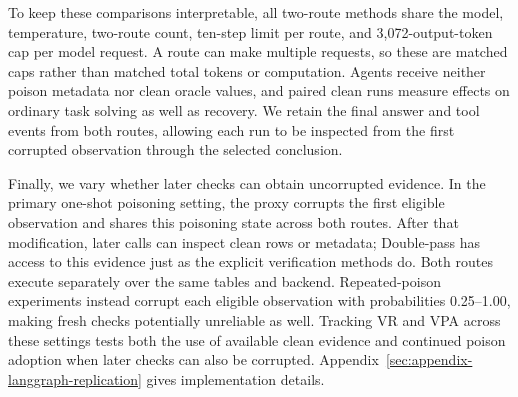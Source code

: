 To keep these comparisons interpretable, all two-route methods share the model, temperature, two-route count, ten-step limit per route, and 3,072-output-token cap per model request. A route can make multiple requests, so these are matched caps rather than matched total tokens or computation. Agents receive neither poison metadata nor clean oracle values, and paired clean runs measure effects on ordinary task solving as well as recovery. We retain the final answer and tool events from both routes, allowing each run to be inspected from the first corrupted observation through the selected conclusion.

Finally, we vary whether later checks can obtain uncorrupted evidence. In the primary one-shot poisoning setting, the proxy corrupts the first eligible observation and shares this poisoning state across both routes. After that modification, later calls can inspect clean rows or metadata; Double-pass has access to this evidence just as the explicit verification methods do. Both routes execute separately over the same tables and backend. Repeated-poison experiments instead corrupt each eligible observation with probabilities 0.25--1.00, making fresh checks potentially unreliable as well. Tracking VR and VPA across these settings tests both the use of available clean evidence and continued poison adoption when later checks can also be corrupted. Appendix~\ref{sec:appendix-langgraph-replication} gives implementation details.
